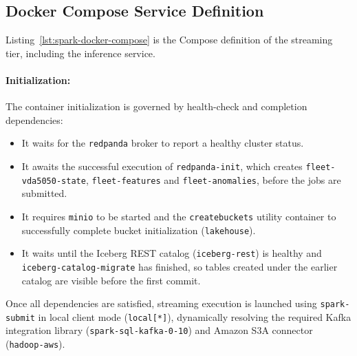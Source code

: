 \subsection{Docker Compose Service Definition}
\label{subsec:spark-docker-definition}

Listing~\ref{lst:spark-docker-compose} is the Compose definition of the streaming tier, including the inference service. 

\paragraph{Initialization:}
The container initialization is governed by health-check and completion dependencies:
\begin{itemize}
    \item It waits for the \texttt{redpanda} broker to report a healthy cluster status.
    \item It awaits the successful execution of \texttt{redpanda-init}, which creates \texttt{fleet-vda5050-state}, \texttt{fleet-features} and \texttt{fleet-anomalies}, before the jobs are submitted.
    \item It requires \texttt{minio} to be started and the \texttt{createbuckets} utility container to successfully complete bucket initialization (\texttt{lakehouse}).
    \item It waits until the Iceberg REST catalog (\texttt{iceberg-rest}) is healthy and \texttt{iceberg-catalog-migrate} has finished, so tables created under the earlier catalog are visible before the first commit.
\end{itemize}

Once all dependencies are satisfied, streaming execution is launched using \texttt{spark-submit} in local client mode (\texttt{local[*]}), dynamically resolving the required Kafka integration library (\texttt{spark-sql-kafka-0-10}) and Amazon S3A connector (\texttt{hadoop-aws}).


